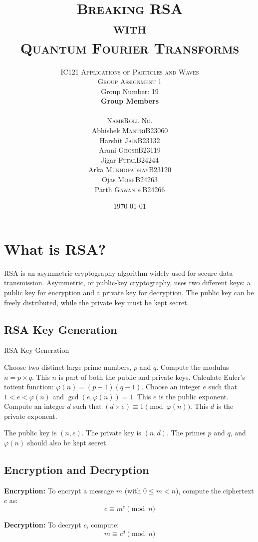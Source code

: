 \documentclass{article}
\title{\Huge\textsc{Breaking RSA \\ with \\ Quantum Fourier Transforms}}
\author{
    \Large\textsc{\vspace{2cm} IC121 Applications of Particles and Waves}\\[2ex]
        \LARGE\textsc{Group Assignment 1}\vspace{0.5cm}\\
        \Large{Group Number: 19}\\[2cm]
        \textbf{\Large Group Members}\vspace{0.5cm}\\[1ex]
        \begin{tabular}{r|l} 
            \hline \hline
            \textsc{Name} & \textsc{Roll No.} \\ \hline 
            Abhishek \textsc{Mantri}        & B23060 \\ 
            Harshit \textsc{Jain}           & B23132 \\
            Arani \textsc{Ghosh}            & B23119 \\
            Jigar \textsc{Fufal}            & B24244 \\
            Arka \textsc{Mukhopadhay}       & B23120 \\
            Ojas \textsc{More}              & B24263 \\
            Parth \textsc{Gawande}          & B24266 \\ 
            \hline \hline
        \end{tabular}
        \vspace{5cm}
}
\date{\today}
\begin{document}
\maketitle
\newpage
\tableofcontents
\newpage

\section{What is RSA?}

\begin{infobox}[title=RSA Overview]
    RSA is an asymmetric cryptography algorithm widely used for secure data transmission. Asymmetric, or public-key cryptography, uses two different keys: a public key for encryption and a private key for decryption. The public key can be freely distributed, while the private key must be kept secret.
\end{infobox}

\subsection{RSA Key Generation}

\begin{algorithm}
    \caption{RSA Key Generation}
    \begin{algorithmic}[1]
        \State Choose two distinct large prime numbers, $p$ and $q$.
        \State Compute the modulus $n = p \times q$. This $n$ is part of both the public and private keys.
        \State Calculate Euler's totient function: $\varphi(n) = (p - 1)(q - 1)$.
        \State Choose an integer $e$ such that $1 < e < \varphi(n)$ and $\gcd(e, \varphi(n)) = 1$. This $e$ is the public exponent.
        \State Compute an integer $d$ such that $(d \times e) \equiv 1 \pmod{\varphi(n)}$. This $d$ is the private exponent.
    \end{algorithmic}
\end{algorithm}

The public key is $(n, e)$. The private key is $(n, d)$. The primes $p$ and $q$, and $\varphi(n)$ should also be kept secret.

\subsection{Encryption and Decryption}

\textbf{Encryption:} To encrypt a message $m$ (with $0 \leq m < n$), compute the ciphertext $c$ as:
\[
    c \equiv m^e \pmod{n}
\]

\textbf{Decryption:} To decrypt $c$, compute:
\[
    m \equiv c^d \pmod{n}
\]
\end{document}
